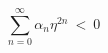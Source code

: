\begin{equation}
\sum_{n=0}^\infty \alpha_n \eta^{2n} ~ < ~ 0
\label{generalcondition}
\end{equation}

